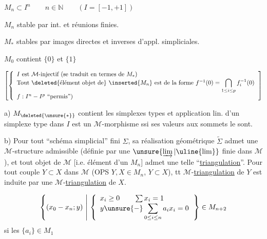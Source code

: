 $M_n\subset I^n\qquad n\in\mathbb N\qquad(I=[-1,+1])$

$M_n$ stable par int. et réunions finies.

$M_*$ stables par images directes et inverses d'appl. simpliciales.

$M_0$ contient  $\{0\}$ et $\{1\}$

$\left[\left\{\begin{array}{l}
I\text{ est }\mathcal M\text{-injectif (se traduit en termes de }M_*\text{)}\\
\text{Tout }\deleted{\text{élément objet de}}\ \inserted{M_n}\text{ est de la forme }
f^{-1}(0)=\displaystyle\bigcap_{1\leq i\leq p}f_i^{-1}(0)\\
f:I^n-I^p\text{ ``permis'')}
\end{array}\right.\right]$
\margin{$\Longrightarrow$}

a) $M_{\deleted{\unsure{*}}}$ contient les simplexes types et   application lin. d'un simplexe type dans $I$ est un $\mathcal M$-morphisme ssi  ses valeurs aux sommets le sont.

b) Pour tout  ``schéma simplicial'' fini $\Sigma$, sa réalisation
géométrique $\widetilde\Sigma$ admet une $\mathcal M$-structure admissible (définie par une $\unsure{\varinjlim|\uline{\lim}}$ finie dans $\mathcal M$), et  tout objet de $\mathcal M$ [i.e.  élément d'un $M_n$] admet une telle ``\uline{triangulation}''.
Pour tout couple $Y\subset X$ dans $\mathcal M$ (OPS $Y,X\in M_n$, $Y\subset X$),  tt  $\mathcal M$-\uline{triangulation} de $Y$ est induite par une $\mathcal M$-\uline{triangulation} de $X$.

\[
\left\{(x_0-x_n;y)\ \middle|\ 
\left\{\begin{array}{l}
x_i\geq0\qquad\sum x_i=1\\
y\unsure{-}\displaystyle\sum_{0\leq i\leq n}a_i x_i=0
\end{array}\right.\right\}\in M_{n+2}
\]
si les $\{a_i\}\in M_1$


